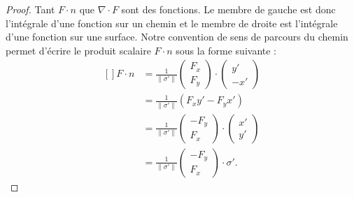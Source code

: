 \begin{proof}
	Tant \( F\cdot n\) que \( \nabla\cdot F\) sont des fonctions. Le membre de gauche est donc l'intégrale d'une fonction sur un chemin et le membre de droite est l'intégrale d'une fonction sur une surface. Notre convention de sens de parcours du chemin permet d'écrire le produit scalaire \( F\cdot n\) sous la forme suivante :
	\begin{equation}
		\begin{aligned}[]
			F\cdot n & =\frac{1}{ \| \sigma' \| }\begin{pmatrix}
				                                     F_x \\
				                                     F_y
			                                     \end{pmatrix}\cdot \begin{pmatrix}
				                                                        y' \\
				                                                        -x'
			                                                        \end{pmatrix} \\
			         & =\frac{1}{ \| \sigma' \| }(F_xy'-F_yx')                     \\
			         & =\frac{1}{ \| \sigma' \| }\begin{pmatrix}
				                                     -F_y \\
				                                     F_x
			                                     \end{pmatrix}\cdot \begin{pmatrix}
				                                                        x' \\
				                                                        y'
			                                                        \end{pmatrix} \\
			         & =\frac{1}{ \| \sigma' \| }\begin{pmatrix}
				                                     -F_y \\
				                                     F_x
			                                     \end{pmatrix}\cdot \sigma'.
		\end{aligned}
	\end{equation}


\end{proof}
